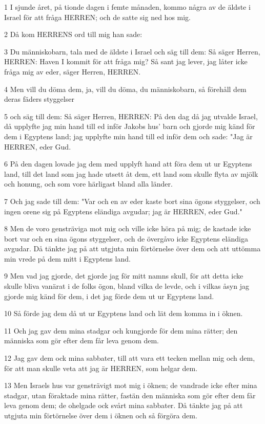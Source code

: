 \par 1 I sjunde året, på tionde dagen i femte månaden, kommo några av de äldste i Israel för att fråga HERREN; och de satte sig ned hos mig.
\par 2 Då kom HERRENS ord till mig han sade:
\par 3 Du människobarn, tala med de äldste i Israel och säg till dem: Så säger Herren, HERREN: Haven I kommit för att fråga mig? Så sant jag lever, jag låter icke fråga mig av eder, säger Herren, HERREN.
\par 4 Men vill du döma dem, ja, vill du döma, du människobarn, så förehåll dem deras fäders styggelser
\par 5 och säg till dem: Så säger Herren, HERREN: På den dag då jag utvalde Israel, då upplyfte jag min hand till ed inför Jakobs hus' barn och gjorde mig känd för dem i Egyptens land; jag upplyfte min hand till ed inför dem och sade: "Jag är HERREN, eder Gud.
\par 6 På den dagen lovade jag dem med upplyft hand att föra dem ut ur Egyptens land, till det land som jag hade utsett åt dem, ett land som skulle flyta av mjölk och honung, och som vore härligast bland alla länder.
\par 7 Och jag sade till dem: "Var och en av eder kaste bort sina ögons styggelser, och ingen orene sig på Egyptens eländiga avgudar; jag är HERREN, eder Gud."
\par 8 Men de voro gensträviga mot mig och ville icke höra på mig; de kastade icke bort var och en sina ögons styggelser, och de övergåvo icke Egyptens eländiga avgudar. Då tänkte jag på att utgjuta min förtörnelse över dem och att uttömma min vrede på dem mitt i Egyptens land.
\par 9 Men vad jag gjorde, det gjorde jag för mitt namns skull, för att detta icke skulle bliva vanärat i de folks ögon, bland vilka de levde, och i vilkas åsyn jag gjorde mig känd för dem, i det jag förde dem ut ur Egyptens land.
\par 10 Så förde jag dem då ut ur Egyptens land och lät dem komma in i öknen.
\par 11 Och jag gav dem mina stadgar och kungjorde för dem mina rätter; den människa som gör efter dem får leva genom dem.
\par 12 Jag gav dem ock mina sabbater, till att vara ett tecken mellan mig och dem, för att man skulle veta att jag är HERREN, som helgar dem.
\par 13 Men Israels hus var gensträvigt mot mig i öknen; de vandrade icke efter mina stadgar, utan föraktade mina rätter, fastän den människa som gör efter dem får leva genom dem; de ohelgade ock svårt mina sabbater. Då tänkte jag på att utgjuta min förtörnelse över dem i öknen och så förgöra dem.
